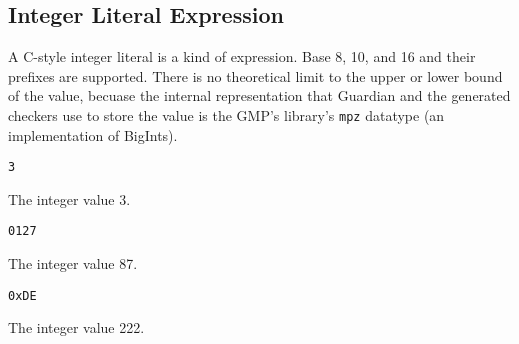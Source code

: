 
\subsection{Integer Literal Expression}
{
	A C-style integer literal is a kind of expression.
	Base 8, 10, and 16 and their prefixes are supported.
	There is no theoretical limit to the upper or lower bound of the value,
	becuase the internal representation that Guardian and the generated checkers 
	use to store the value
	is the GMP's library's \texttt{mpz} datatype (an implementation of BigInts).
	
	\begin{itemize}
	{
		\item[] \lstinline[language=MAIA, columns=fixed]@3@
		
			The integer value 3.
		
		\item[] \lstinline[language=MAIA, columns=fixed]@0127@
		
			The integer value 87.
		
		\item[] \lstinline[language=MAIA, columns=fixed]@0xDE@
		
			The integer value 222.
	}
	\end{itemize}
}
